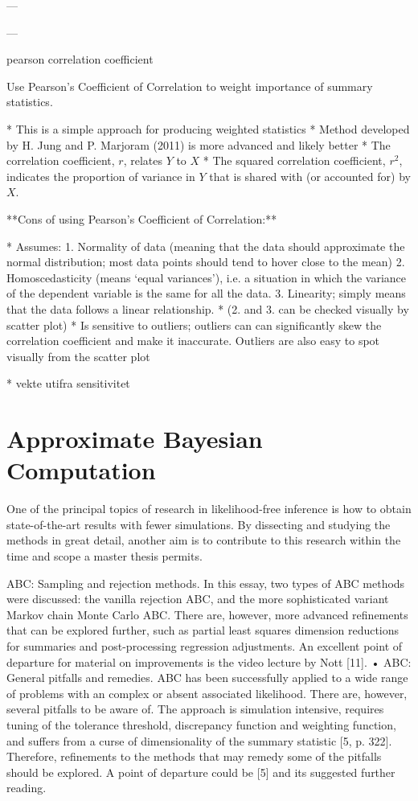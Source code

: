 ---

---

pearson correlation coefficient

Use Pearson's Coefficient of Correlation to weight importance of summary statistics.

* This is a simple approach for producing weighted statistics 
    * Method developed by H. Jung and P. Marjoram (2011) is more advanced and likely better
* The correlation coefficient, $r$, relates $Y$ to $X$ 
* The squared correlation coefficient, $r^2$, indicates the proportion of variance in $Y$ that is shared with (or accounted for) by $X$.

**Cons of using Pearson's Coefficient of Correlation:**

* Assumes:
    1. Normality of data (meaning that the data should approximate the normal distribution; most data points should tend to hover close to the mean)
    2. Homoscedasticity (means ‘equal variances’), i.e. a situation in which the variance of the dependent variable is the same for all the data.
    3. Linearity; simply means that the data follows a linear relationship. 
* (2. and 3. can be checked visually by scatter plot)
* Is sensitive to outliers; outliers can can significantly skew the correlation coefficient and make it inaccurate. Outliers are also easy to spot visually from the scatter plot

* vekte utifra sensitivitet

\section{Approximate Bayesian Computation}

One of the principal topics of research in likelihood-free inference is how to obtain state-of-the-art results with fewer simulations. By dissecting and studying the methods in great detail, another aim is to contribute to this research within the time and scope a master thesis permits. 

ABC: Sampling and rejection methods. In this essay, two types of ABC methods were discussed: the vanilla rejection ABC, and the more sophisticated variant Markov chain Monte Carlo ABC. There are, however, more advanced refinements that can be explored further, such as partial least squares dimension reductions for summaries and post-processing regression adjustments. An excellent point of departure for material on improvements is the video lecture by Nott [11].
• ABC: General pitfalls and remedies. ABC has been successfully applied to a wide range of problems with an complex or absent associated likelihood. There are, however, several pitfalls to be aware of. The approach is simulation intensive, requires tuning of the tolerance threshold, discrepancy function and weighting function, and suffers from a curse of dimensionality of the summary statistic [5, p. 322]. Therefore, refinements to the methods that may remedy some of the pitfalls should be explored. A point of departure could be [5] and its suggested further reading. 

